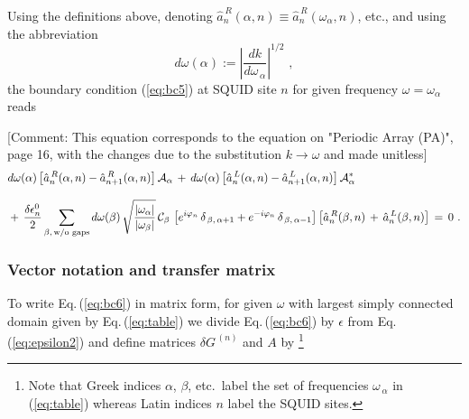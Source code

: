 \noindent
Using the definitions above, denoting $\hat{a}_n^{\,R}(\alpha,n) \equiv \hat{a}_n^{\,R}(\omega_{\alpha},n)$, etc., 
and using the abbreviation
%
\begin{equation} \label{eq:dwn}
d\omega(\alpha) := \left|\frac{dk}{d\omega_{\,\alpha}} \right|^{1/2} \, \, ,
\end{equation}
%
the boundary condition (\ref{eq:bc5}) at SQUID site $n$ for given frequency $\omega = \omega_{\alpha}$ reads

\noindent
\color{red}
[Comment: This equation corresponds to the equation on "Periodic Array (PA)", page 16,
with the changes due to the substitution $k \to \omega$ and made unitless]
\color{black}
%
\begin{equation} \label{eq:bc6}
\begin{split}
& d\omega(\alpha) \left[ \hat{a}_n^{\,R}(\alpha,n) - \hat{a}_{n+1}^{\,R}(\alpha,n) \right] 
{\cal A}_{\alpha} \, + \, 
d\omega(\alpha) \left[ \hat{a}_n^{\,L}(\alpha,n) - \hat{a}_{n+1}^{\,L}(\alpha,n) \right] 
{\cal A}_{\alpha}^* \\[3mm]
& + \, \frac{\delta \epsilon_n^0}{2}
\sum_{\beta, \, \text{w/o gaps}} d\omega(\beta) \, 
\sqrt{\frac{|\omega_{\alpha}|}{|\omega_{\beta}|}} \, {\cal C}_{\beta} \,
\left[e^{i \varphi_n} \, \delta_{\,\beta,\,\alpha+1} + e^{- i \varphi_n} \, \delta_{\,\beta,\,\alpha-1} \right]
\left[ \hat{a}_n^{\,R}(\beta,n) \, + \, \hat{a}_n^{\,L}(\beta,n) \right] \, = \, 0 \, \, .
\end{split}
\end{equation}


\subsubsection{Vector notation and transfer matrix} \label{subsubsec:vector}

To write Eq.\,(\ref{eq:bc6}) in matrix form, for given $\omega$ with largest simply connected 
domain given by Eq.\,(\ref{eq:table})  
we divide Eq.\,(\ref{eq:bc6}) by $\epsilon$ 
from Eq.\,(\ref{eq:epsilon2}) and define matrices $\delta G^{\,(n)}$ and $A$ by
%
\footnote{Note that Greek indices $\alpha$, $\beta$, etc.~label the set of frequencies 
$\omega_{\,\alpha}$ in (\ref{eq:table}) whereas Latin indices $n$ label the SQUID sites.}

